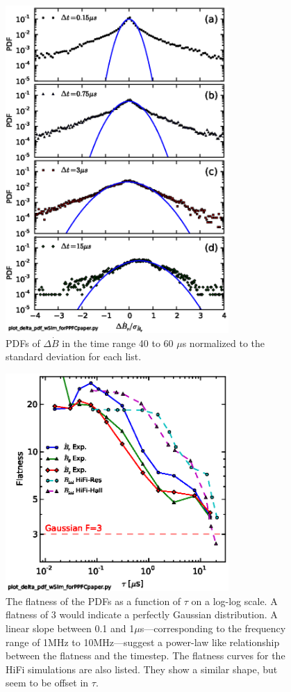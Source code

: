 \documentclass[12pt]{iopart}
\begin{document}
\begin{figure}[!htbp]
\centerline{
\includegraphics[width=8.5cm]{pdfs.eps}}
\caption{\label{fig:pdfs} PDFs of $\Delta \dot{B}$ in the time range 40 to 60 $\mu$s normalized to the standard deviation for each list.}
\end{figure}
\begin{figure}[!htbp]
\centerline{
\includegraphics[width=8.5cm]{flatness.eps}}
\caption{\label{fig:flatness} The flatness of the PDFs as a function of $\tau$ on a log-log scale. A flatness of 3 would indicate a perfectly Gaussian distribution. A linear slope between 0.1 and 1$\mu$s---corresponding to the frequency range of 1MHz to 10MHz---suggest a power-law like relationship between the flatness and the timestep. The flatness curves for the HiFi simulations are also listed. They show a similar shape, but seem to be offset in $\tau$.}
\end{figure}
\end{document}
